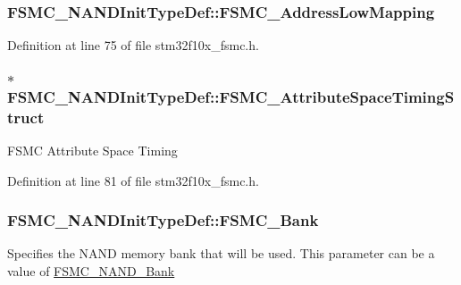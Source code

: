 \subsubsection[{\texorpdfstring{F\+S\+M\+C\+\_\+\+Address\+Low\+Mapping}{FSMC_AddressLowMapping}}]{ F\+S\+M\+C\+\_\+\+N\+A\+N\+D\+Init\+Type\+Def\+::\+F\+S\+M\+C\+\_\+\+Address\+Low\+Mapping}\hypertarget{struct_f_s_m_c___n_a_n_d_init_type_def_af7affbed59a0cd0a102aa76d06342849}{}\label{struct_f_s_m_c___n_a_n_d_init_type_def_af7affbed59a0cd0a102aa76d06342849}


Definition at line 75 of file stm32f10x\+\_\+fsmc.\+h.

\subsubsection[{\texorpdfstring{F\+S\+M\+C\+\_\+\+Attribute\+Space\+Timing\+Struct}{FSMC_AttributeSpaceTimingStruct}}]{ $\ast$ F\+S\+M\+C\+\_\+\+N\+A\+N\+D\+Init\+Type\+Def\+::\+F\+S\+M\+C\+\_\+\+Attribute\+Space\+Timing\+Struct}\hypertarget{struct_f_s_m_c___n_a_n_d_init_type_def_a586c3d691f1d786510cc75bf2b164f42}{}\label{struct_f_s_m_c___n_a_n_d_init_type_def_a586c3d691f1d786510cc75bf2b164f42}
F\+S\+MC Attribute Space Timing 

Definition at line 81 of file stm32f10x\+\_\+fsmc.\+h.

\subsubsection[{\texorpdfstring{F\+S\+M\+C\+\_\+\+Bank}{FSMC_Bank}}]{ F\+S\+M\+C\+\_\+\+N\+A\+N\+D\+Init\+Type\+Def\+::\+F\+S\+M\+C\+\_\+\+Bank}\hypertarget{struct_f_s_m_c___n_a_n_d_init_type_def_a385085e661b9bb83dc73209cd318d0ab}{}\label{struct_f_s_m_c___n_a_n_d_init_type_def_a385085e661b9bb83dc73209cd318d0ab}
Specifies the N\+A\+ND memory bank that will be used. This parameter can be a value of \hyperlink{group___f_s_m_c___n_a_n_d___bank}{F\+S\+M\+C\+\_\+\+N\+A\+N\+D\+\_\+\+Bank} 

